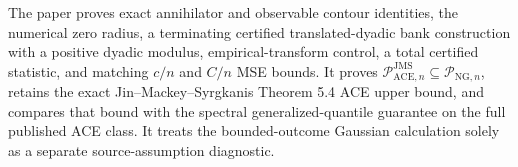 The paper proves exact annihilator and observable contour identities, the numerical zero radius, a terminating certified translated-dyadic bank construction with a positive dyadic modulus, empirical-transform control, a total certified statistic, and matching \(c/n\) and \(C/n\) MSE bounds. It proves \(\mathcal P_{\mathrm{ACE},n}^{\mathrm{JMS}}\subseteq\mathcal P_{\mathrm{NG},n}\), retains the exact Jin--Mackey--Syrgkanis Theorem 5.4 ACE upper bound, and compares that bound with the spectral generalized-quantile guarantee on the full published ACE class. It treats the bounded-outcome Gaussian calculation solely as a separate source-assumption diagnostic.